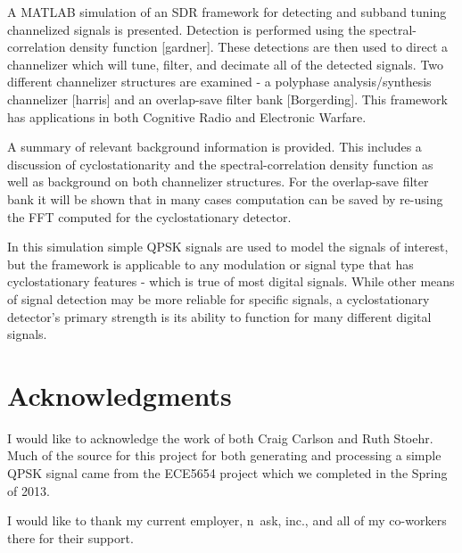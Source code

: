 \documentclass[12pt,dvips]{report}
\begin{document}
A MATLAB simulation of an SDR framework for detecting and subband tuning
channelized signals is presented.  Detection is performed using the
spectral-correlation density function [gardner].  These detections are then used to direct
a channelizer which will tune, filter, and decimate all of the detected signals.
Two different channelizer structures are examined - a polyphase
analysis/synthesis channelizer [harris] and an overlap-save filter bank
[Borgerding]. This framework has applications in both Cognitive Radio and
Electronic Warfare.

A summary of relevant background information is provided.  This includes a
discussion of cyclostationarity and the spectral-correlation density function
as well as background on both channelizer structures. For the overlap-save
filter bank it will be shown that in many cases computation can be saved by
re-using the FFT computed for the cyclostationary detector.

In this simulation simple QPSK signals are used to model the signals of 
interest, but the framework is applicable to any modulation or signal type
that has cyclostationary features - which is true of most digital signals. 
While other means of signal detection may be more reliable for specific signals,
a cyclostationary detector's primary strength is its ability to function for many
different digital signals.

\vfill



\pagebreak

\chapter*{Acknowledgments}
I would like to acknowledge the work of both Craig Carlson and Ruth Stoehr. Much of the source for this project for both generating and processing a simple 
QPSK signal came from the ECE5654 project which we completed in the Spring 
of 2013.

I would like to thank my current employer, n~ask, inc., and all of my co-workers
there for their support.
\end{document}
